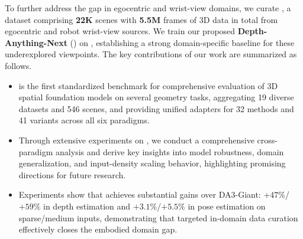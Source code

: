 To further address the gap in egocentric and wrist-view domains, we curate \textbf{\dataset}, a dataset comprising \textbf{22K} scenes with \textbf{5.5M} frames of 3D data in total from egocentric and robot wrist-view sources. 
%
We train our proposed \textbf{Depth-Anything-Next} (\ours) on \dataset, establishing a strong domain-specific baseline for these underexplored viewpoints.
%
The key contributions of our work are summarized as follows.
\begin{itemize}
    \item \benchmark is the first standardized benchmark for comprehensive evaluation of 3D spatial foundation models on several geometry tasks, aggregating 19 diverse datasets and 546 scenes, and providing unified adapters for 32 methods and 41 variants across all six paradigms.
    \item Through extensive experiments on \benchmark, we conduct a comprehensive cross-paradigm analysis and derive key insights into model robustness, domain generalization, and input-density scaling behavior, highlighting promising directions for future research.
    \item Experiments show that \ours achieves substantial gains over DA3-Giant: $+47\%$/$+59\%$ in depth estimation and $+3.1\%$/$+5.5\%$ in pose estimation on sparse/medium inputs, demonstrating that targeted in-domain data curation effectively closes the embodied domain gap.
\end{itemize}
